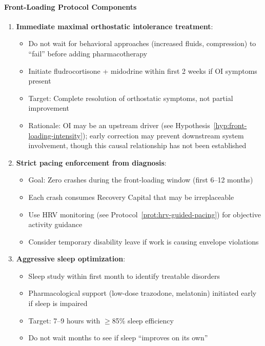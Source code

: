 \paragraph{Front-Loading Protocol Components}

\begin{enumerate}
    \item \textbf{Immediate maximal orthostatic intolerance treatment}:
    \begin{itemize}
        \item Do not wait for behavioral approaches (increased fluids, compression) to ``fail'' before adding pharmacotherapy
        \item Initiate fludrocortisone + midodrine within first 2 weeks if OI symptoms present
        \item Target: Complete resolution of orthostatic symptoms, not partial improvement
        \item Rationale: OI may be an upstream driver (see Hypothesis~\ref{hyp:front-loading-intensity}); early correction may prevent downstream system involvement, though this causal relationship has not been established
    \end{itemize}

    \item \textbf{Strict pacing enforcement from diagnosis}:
    \begin{itemize}
        \item Goal: Zero crashes during the front-loading window (first 6--12 months)
        \item Each crash consumes Recovery Capital that may be irreplaceable
        \item Use HRV monitoring (see Protocol~\ref{prot:hrv-guided-pacing}) for objective activity guidance
        \item Consider temporary disability leave if work is causing envelope violations
    \end{itemize}

    \item \textbf{Aggressive sleep optimization}:
    \begin{itemize}
        \item Sleep study within first month to identify treatable disorders
        \item Pharmacological support (low-dose trazodone, melatonin) initiated early if sleep is impaired
        \item Target: 7--9 hours with $\geq$85\% sleep efficiency
        \item Do not wait months to see if sleep ``improves on its own''
    \end{itemize}


\end{enumerate}
